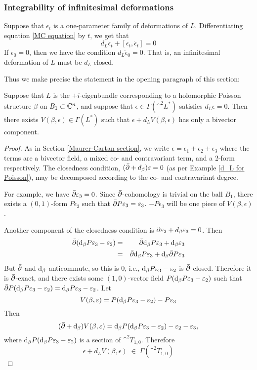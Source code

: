 \documentclass{article}
\begin{document}
\subsubsection*{Integrability of infinitesimal deformations}

Suppose that $\epsilon_t$ is a one-parameter family of deformations of $L$.  Differentiating equation \eqref{MC equation} by $t$, we get that
$$d_L \dot\epsilon_t + [\epsilon_t,\dot\epsilon_t] = 0$$
If $\epsilon_0 = 0$, then we have the condition $d_L \dot\epsilon_0 = 0$.  That is, an infinitesimal deformation of $L$ must be $d_L$-closed.

Thus we make precise the statement in the opening paragraph of this section:
\begin{prop}\label{infinitesimal correction}
Suppose that $L$ is the $+i$-eigenbundle corresponding to a holomorphic Poisson structure $\beta$ on $B_1\subset\mathbb C^n$, and suppose that $\epsilon \in \Gamma(\^ ^2 L^*)$ satisfies $d_L \epsilon = 0$.  Then there exists $V(\beta,\epsilon) \in \Gamma(L^*)$ such that $\epsilon + d_L V(\beta,\epsilon)$ has only a bivector component.
\end{prop}

\begin{proof}
As in Section \ref{Maurer-Cartan section}, we write $\epsilon = \epsilon_1 + \epsilon_2 + \epsilon_3$ where the terms are a bivector field, a mixed co- and contravariant term, and a 2-form respectively.  The closedness condition, $(\bar{\partial} + d_\beta)\varepsilon = 0$ (as per Example \ref{d_L for Poisson}), may be decomposed according to the co- and contravariant degree.

For example, we have $\bar{\partial}\varepsilon_3 = 0$.  Since $\bar{\partial}$-cohomology is trivial on the ball $B_1$, there exists a $(0,1)$-form $P\epsilon_3$ such that $\bar{\partial} P\varepsilon_3 = \varepsilon_3$.  $-P\epsilon_3$ will be one piece of $V(\beta,\epsilon)$.

Another component of the closedness condition is $\bar{\partial}\varepsilon_2 + d_\beta\varepsilon_3 = 0$.  Then
\begin{eqnarray*}
\bar{\partial}(\textrm{d}_\beta P\varepsilon_3 - \varepsilon_2) &=& \bar{\partial}\textrm{d}_\beta P\varepsilon_3 + \textrm{d}_\beta\varepsilon_3 \\
&=& \bar{\partial}\textrm{d}_\beta P\varepsilon_3 + \textrm{d}_\beta\bar{\partial} P\varepsilon_3
\end{eqnarray*}
But $\bar{\partial}$ and $\textrm{d}_\beta$ anticommute, so this is $0$, i.e., $\textrm{d}_\beta P\varepsilon_3 - \varepsilon_2$ is $\bar{\partial}$-closed.  Therefore it is $\bar{\partial}$-exact, and there exists some $(1,0)$-vector field $P(\textrm{d}_\beta P\varepsilon_3 - \varepsilon_2)$ such that $\bar{\partial} P(\textrm{d}_\beta P\varepsilon_3 - \varepsilon_2) = \textrm{d}_\beta P\varepsilon_3 - \varepsilon_2$.  Let
\begin{equation}\label{construct V}
V(\beta,\epsilon) = P(\d_\beta P\epsilon_3 - \epsilon_2) - P\epsilon_3
\end{equation}
Then
$$(\bar{\partial} + \textrm{d}_\beta)V(\beta,\varepsilon) = \textrm{d}_\beta P(\textrm{d}_\beta P\varepsilon_3 - \varepsilon_2) - \varepsilon_2 - \varepsilon_3,$$
where $\textrm{d}_\beta P(\textrm{d}_\beta P\varepsilon_3 - \varepsilon_2)$ is a section of $\^ ^2 T_{1,0}$.  Therefore
$$\epsilon + d_L V(\beta,\epsilon) \;\in\; \Gamma(\^ ^2 T_{1,0})$$
\end{proof}
\end{document}
